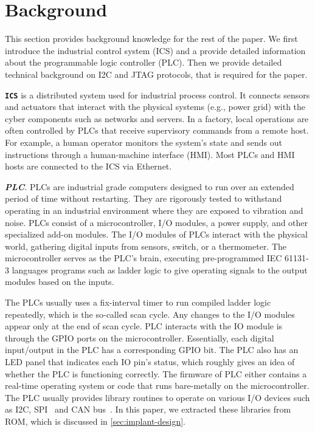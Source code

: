 \section{Background}
\label{sec:implant-background}

This section provides background knowledge for the rest of the paper. We first introduce the industrial control system (ICS) and a provide detailed information about the programmable logic controller (PLC). Then we provide detailed technical background on I2C and JTAG protocols, that is required for the paper.

\textbf{\texttt{ICS}} is a distributed system used for industrial process control. It connects sensors and actuators that interact with the physical systems (e.g., power grid) with the cyber components such as networks and servers. In a factory, local operations are often controlled by PLCs that receive supervisory commands from a remote host. For example, a human operator monitors the system's state and sends out instructions through a human-machine interface (HMI). Most PLCs and HMI hosts are connected to the ICS via Ethernet.

\textbf{\textit{PLC}}. PLCs are industrial grade computers designed to run over an extended period of time without restarting. They are rigorously tested to withstand operating in an industrial environment where they are exposed to vibration and noise. PLCs consist of a microcontroller, I/O modules, a power supply, and other specialized add-on modules. The I/O modules of PLCs interact with the physical world, gathering digital inputs from sensors, switch, or a thermometer. The microcontroller serves as the PLC's brain, executing pre-programmed IEC 61131-3 languages programs such as ladder logic to give operating signals to the output modules based on the inputs. 

The PLCs usually uses a fix-interval timer to run compiled ladder logic repeatedly, which is the so-called scan cycle. Any changes to the I/O modules appear only at the end of scan cycle. PLC interacts with the IO module is through the GPIO ports on the microcontroller. Essentially, each digital input/output in the PLC has a corresponding GPIO bit. The PLC also has an LED panel that indicates each IO pin's status, which roughly gives an idea of whether the PLC is functioning correctly. The firmware of PLC either contains a real-time operating system or code that runs bare-metally on the microcontroller. The PLC usually provides library routines to operate on various I/O devices such as I2C, SPI~\cite{leens2009introduction} and CAN bus~\cite{bozdal2018survey}. In this paper, we extracted these libraries from ROM, which is discussed in  \autoref{sec:implant-design}.

